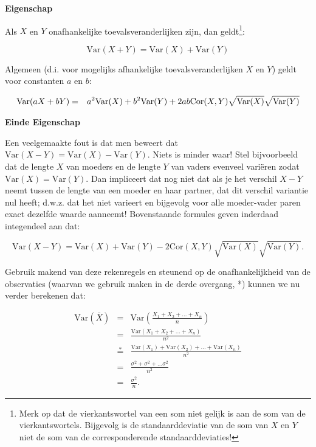 \documentclass[12pt,dutch,coursenotes]{book}
\let\rmarkdownfootnote\footnote%
\def\footnote{\protect\rmarkdownfootnote}
\theoremstyle{definition}
\theoremstyle{definition}
\theoremstyle{definition}
\theoremstyle{remark}
\begin{document}
\textbf{Eigenschap}

Als \(X\) en \(Y\) onafhankelijke toevalsveranderlijken zijn, dan
geldt\footnote{Merk op dat de vierkantswortel van een som niet gelijk is
  aan de som van de vierkantswortels. Bijgevolg is de standaarddeviatie
  van de som van \(X\) en \(Y\) niet de som van de corresponderende
  standaarddeviaties!}:

\begin{equation*}
\text{Var}(X+Y) = \text{Var}(X) + \text{Var}(Y)
\end{equation*}

Algemeen (d.i. voor mogelijks afhankelijke toevalsveranderlijken \(X\)
en \(Y\)) geldt voor constanten \(a\) en \(b\):

\begin{eqnarray*}
\text{Var}(aX+bY) &=& a^2 \text{Var}(X) + b^2 \text{Var}(Y) + 2 ab {%
\text{Cor}}(X,Y)\sqrt{\text{Var}(X)}\sqrt{\text{Var}(Y)}
\end{eqnarray*}

\textbf{Einde Eigenschap}

Een veelgemaakte fout is dat men beweert dat
\(\text{Var}(X-Y)=\text{Var}(X)-\text{Var}(Y)\). Niets is minder waar!
Stel bijvoorbeeld dat de lengte \(X\) van moeders en de lengte \(Y\) van
vaders evenveel variëren zodat \(\text{Var}(X)=\text{Var}(Y)\). Dan
impliceert dat nog niet dat als je het verschil \(X-Y\) neemt tussen de
lengte van een moeder en haar partner, dat dit verschil variantie nul
heeft; d.w.z. dat het niet varieert en bijgevolg voor alle moeder-vader
paren exact dezelfde waarde aanneemt! Bovenstaande formules geven
inderdaad integendeel aan dat:

\begin{equation*}
\text{Var}(X-Y) = \text{Var}(X) + \text{Var}(Y) -2{\text{Cor}}(X,Y)\sqrt{\text{Var}(X)}\sqrt{\text{Var}(Y)}.
\end{equation*}

Gebruik makend van deze rekenregels en steunend op de onafhankelijkheid
van de observaties (waarvan we gebruik maken in de derde overgang, *)
kunnen we nu verder berekenen dat:

\begin{eqnarray*}
\text{Var}(\bar X)&=&\text{Var} \left(\frac{X_1+ X_2+ ... + X_n}{n}\right) \\
&= & \frac{\text{Var} (X_1+ X_2+ ... + X_n)}{n^2} \\
&\overset{*}{=} & \frac{\text{Var}(X_1)+ \text{Var}(X_2)+ ... + \text{Var}(X_n)}{n^2} \\
&=& \frac{\sigma^2 + \sigma^2 + ... \sigma^2}{n^2} \\
&= & \frac{\sigma^2}{n}.
\end{eqnarray*}
\end{document}
